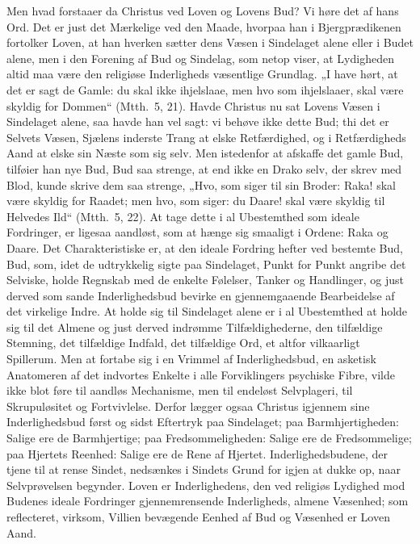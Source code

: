 \documentclass[12pt]{book}
\begin{document}
Men hvad forstaaer da Christus ved Loven og Lovens Bud? Vi høre det
af hans Ord. Det er just det Mærkelige ved den Maade, hvorpaa han i
Bjergprædikenen fortolker Loven, at han hverken sætter dens Væsen i
Sindelaget alene eller i Budet alene, men i den Forening af Bud og
Sindelag, som netop viser, at Lydigheden altid maa være den
religiøse Inderligheds væsentlige Grundlag. „I have hørt, at det er
sagt de Gamle: du skal ikke ihjelslaae, men hvo som ihjelslaaer,
skal være skyldig for Dommen“ (Mtth.\ 5, 21). Havde Christus nu sat
Lovens Væsen i Sindelaget alene, saa havde han vel sagt: vi behøve
ikke dette Bud; thi det er Selvets Væsen, Sjælens inderste Trang at
elske Retfærdighed, og i Retfærdigheds Aand at elske sin Næste som
sig selv. Men istedenfor at afskaffe det gamle Bud, tilføier han nye
Bud, Bud saa strenge, at end ikke en Drako selv, der skrev med Blod,
kunde skrive dem saa strenge, „Hvo, som siger til sin Broder: Raka!
skal være skyldig for Raadet; men hvo, som siger: du Daare! skal
være skyldig til Helvedes Ild“ (Mtth.\ 5, 22). At tage dette i al
Ubestemthed som ideale Fordringer, er ligesaa aandløst, som at hænge
sig smaaligt i Ordene: Raka og Daare. Det Charakteristiske er, at
den ideale Fordring hefter ved bestemte Bud, Bud, som, idet de
udtrykkelig sigte paa Sindelaget, Punkt for Punkt angribe det
Selviske, holde Regnskab med de enkelte Følelser, Tanker og
Handlinger, og just derved som sande Inderlighedsbud bevirke en
gjennemgaaende Bearbeidelse af det virkelige Indre. At holde sig til
Sindelaget alene er i al Ubestemthed at holde sig til det Almene og
just derved indrømme Tilfældighederne, den tilfældige Stemning, det
tilfældige Indfald, det tilfældige Ord, et altfor vilkaarligt
Spillerum. Men at fortabe sig i en Vrimmel af Inderlighedsbud, en
asketisk Anatomeren af det indvortes Enkelte i alle Forviklingers
psychiske Fibre, vilde ikke blot føre til aandløs Mechanisme, men
til endeløst Selvplageri, til Skrupuløsitet og Fortvivlelse. Derfor
lægger ogsaa Christus igjennem sine Inderlighedsbud først og sidst
Eftertryk paa Sindelaget; paa Barmhjertigheden: Salige ere de
Barmhjertige; paa Fredsommeligheden: Salige ere de Fredsommelige;
paa Hjertets Reenhed: Salige ere de Rene af Hjertet.
Inderlighedsbudene, der tjene til at rense Sindet, nedsænkes i
Sindets Grund for igjen at dukke op, naar Selvprøvelsen begynder.
Loven er Inderlighedens, den ved religiøs Lydighed mod Budenes
ideale Fordringer gjennemrensende Inderligheds, almene Væsenhed; som
reflecteret, virksom, Villien bevægende Eenhed af Bud og Væsenhed er
Loven Aand.
\end{document}
